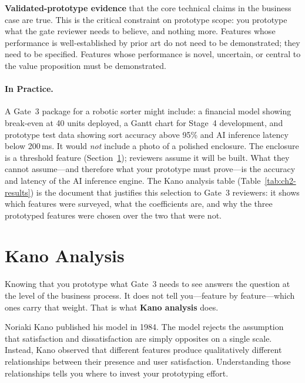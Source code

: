 \textbf{Validated-prototype evidence} that the core technical claims in
the business case are true.
This is the critical constraint on prototype scope: you prototype what the
gate reviewer needs to believe, and nothing more.
Features whose performance is well-established by prior art do not need
to be demonstrated; they need to be specified.
Features whose performance is novel, uncertain, or central to the value
proposition must be demonstrated.

\paragraph{In Practice.}
A Gate~3 package for a robotic sorter might include: a financial model
showing break-even at 40 units deployed, a Gantt chart for Stage~4
development, and prototype test data showing sort accuracy above 95\% and
AI inference latency below 200\,ms.
It would \emph{not} include a photo of a polished enclosure.
The enclosure is a threshold feature (Section~\ref{sec:ch2-kano});
reviewers assume it will be built.
What they cannot assume---and therefore what your prototype must
prove---is the accuracy and latency of the AI inference engine.
The Kano analysis table (Table~\ref{tab:ch2-results}) is the document
that justifies this selection to Gate~3 reviewers: it shows which
features were surveyed, what the coefficients are, and why the three
prototyped features were chosen over the two that were not.

\section{Kano Analysis}
\label{sec:ch2-kano}

Knowing that you prototype what Gate~3 needs to see answers the question
at the level of the business process.
It does not tell you---feature by feature---which ones carry that weight.
That is what \textbf{Kano analysis} does.

Noriaki Kano published his model in 1984.
The model rejects the assumption that satisfaction and dissatisfaction
are simply opposites on a single scale.
Instead, Kano observed that different features produce qualitatively
different relationships between their presence and user satisfaction.
Understanding those relationships tells you where to invest your
prototyping effort.

